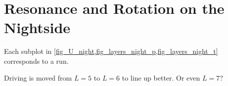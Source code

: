 






\section{Resonance and Rotation on the Nightside}
  \label{sec_night}

Each subplot in \cref{fig_U_night,fig_layers_night_p,fig_layers_night_t} corresponds to a run. 

Driving is moved from $L=5$ to $L=6$ to line up better. Or even $L=7$?


